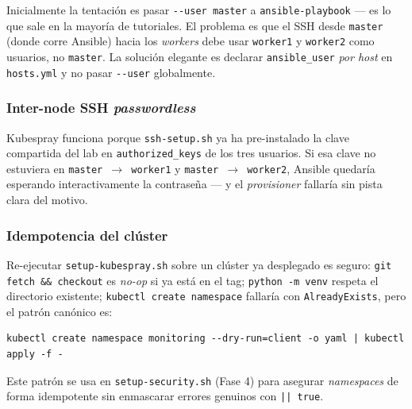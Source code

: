 Inicialmente la tentación es pasar \texttt{-{}-user master} a \texttt{ansible-playbook} --- es lo que sale en la mayoría de tutoriales. El problema es que el SSH desde \texttt{master} (donde corre Ansible) hacia los \emph{workers} debe usar \texttt{worker1} y \texttt{worker2} como usuarios, no \texttt{master}. La solución elegante es declarar \texttt{ansible\_user} \emph{por host} en \texttt{hosts.yml} y no pasar \texttt{-{}-user} globalmente.

\subsubsection{Inter-node SSH \emph{passwordless}}

Kubespray funciona porque \texttt{ssh-setup.sh} ya ha pre-instalado la clave compartida del lab en \texttt{authorized\_keys} de los tres usuarios. Si esa clave no estuviera en \texttt{master $\to$ worker1} y \texttt{master $\to$ worker2}, Ansible quedaría esperando interactivamente la contraseña --- y el \emph{provisioner} fallaría sin pista clara del motivo.

\subsubsection{Idempotencia del clúster}

Re-ejecutar \texttt{setup-kubespray.sh} sobre un clúster ya desplegado es seguro: \texttt{git fetch \&\& checkout} es \emph{no-op} si ya está en el tag; \texttt{python -m venv} respeta el directorio existente; \texttt{kubectl create namespace} fallaría con \texttt{AlreadyExists}, pero el patrón canónico es:

\begin{lstlisting}[style=bash]
kubectl create namespace monitoring --dry-run=client -o yaml | kubectl apply -f -
\end{lstlisting}

Este patrón se usa en \texttt{setup-security.sh} (Fase 4) para asegurar \emph{namespaces} de forma idempotente sin enmascarar errores genuinos con \texttt{|| true}.
